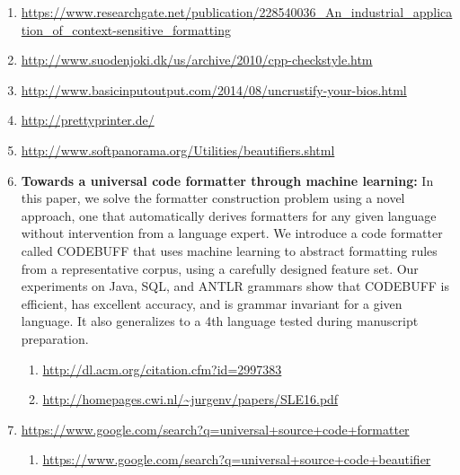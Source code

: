     \begin{sloppypar}
    \begin{myquote}\RaggedRight
    \begin{enumerate}[leftmargin=*,parsep=0pt]

    \item \url{https://www.researchgate.net/publication/228540036_An_industrial_application_of_context-sensitive_formatting}

    \item \url{http://www.suodenjoki.dk/us/archive/2010/cpp-checkstyle.htm}

    \item \url{http://www.basicinputoutput.com/2014/08/uncrustify-your-bios.html}

    \item \url{http://prettyprinter.de/}

    \item \url{http://www.softpanorama.org/Utilities/beautifiers.shtml}

    \item

    {\bfseries Towards a universal code formatter through machine learning:}
    In this paper, we solve the formatter construction problem using a novel approach, one that
    automatically derives formatters for any given language without intervention from a language
    expert. We introduce a code formatter called CODEBUFF that uses machine learning to abstract
    formatting rules from a representative corpus, using a carefully designed feature set. Our
    experiments on Java, SQL, and ANTLR grammars show that CODEBUFF is efficient, has excellent
    accuracy, and is grammar invariant for a given language. It also generalizes to a 4th language
    tested during manuscript preparation.
    \begin{enumerate}[nolistsep,topsep=0pt,label=$\star$]
        \item \url{http://dl.acm.org/citation.cfm?id=2997383}
        \item \url{http://homepages.cwi.nl/~jurgenv/papers/SLE16.pdf}
    \end{enumerate}

    \item \url{https://www.google.com/search?q=universal+source+code+formatter}
    \begin{enumerate}[nolistsep,topsep=0pt,label=$\star$]
        \item \url{https://www.google.com/search?q=universal+source+code+beautifier}
    \end{enumerate}


\end{enumerate}
\end{myquote}
\end{sloppypar}
